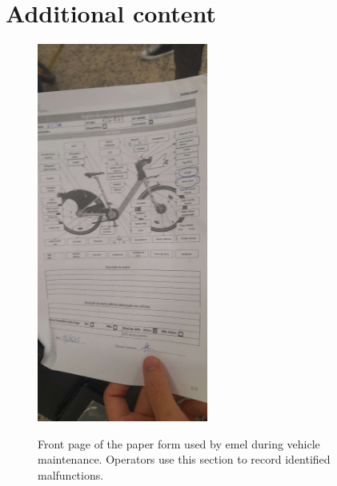 \chapter{Additional content}


\begin{figure}[htbp]
  \caption{Front page of the paper form used by \acs{emel} during vehicle maintenance. Operators use this section to record identified malfunctions.}
  \centering
  \includegraphics[width=0.50\textwidth]{figs/chapter2/emel_front}
  \label{fig:emel_front}
\end{figure}

